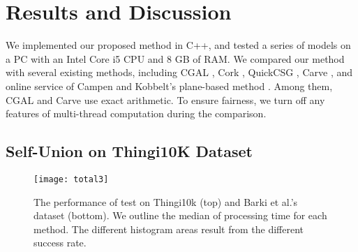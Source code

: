 \section{Results and Discussion}

\iffalse
\begin{figure}[t]
\centering
\texttt{[image: perturb]}
\caption{After perturbation, the self-union of \emph{Bunny} with QuickCSG still suffers from topology problem. The green boundary faces indicate topological deficiencies.}
%
\label{fig:boundaryedge}
\end{figure}

\begin{figure}[t]
\centering
\texttt{[image: buddalion]}
\caption{ Results from $Budda\cup Lion$: a) incorrect result using CGAL, b) incorrect result using Cork, and c) correct result using our method. }
\label{fig:buddalion}
\end{figure}
\fi

We implemented our proposed method in C++, and tested a series of models on a PC with an Intel Core i5 CPU and 8 GB of RAM. We compared our method with several existing methods, including CGAL \cite{cgal:hk-bonp3-15a}, Cork  \cite{Cork}, QuickCSG \cite{douze2015quickcsg}, Carve \cite{Carve}, and online service of Campen and Kobbelt's plane-based method \cite{campen2010exact,WebBSP}. Among them, CGAL and Carve use exact arithmetic. To ensure fairness, we turn off any features of multi-thread computation during the comparison.



\subsection{Self-Union on Thingi10K Dataset}

\begin{figure}[t]
\centering
\texttt{[image: total3]}
\caption{The performance of test on Thingi10k (top) and Barki et al.'s dataset (bottom). We outline the median of processing time for each method. The different histogram areas result from the different success rate.}
\label{fig:total}
\end{figure}




